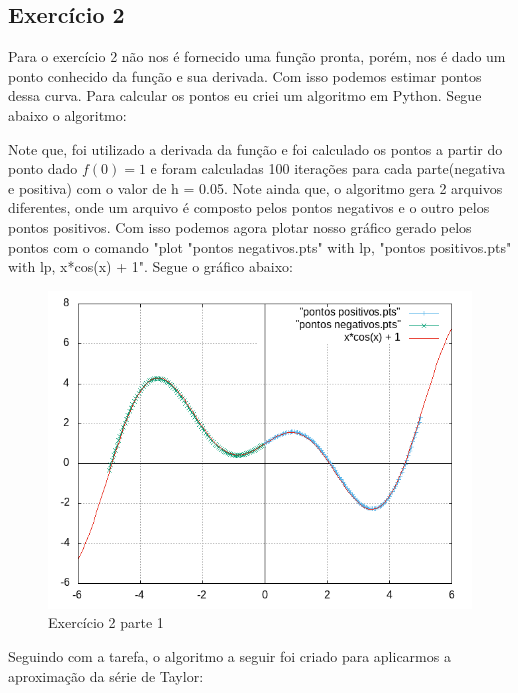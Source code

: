 \documentclass{article}
\begin{document}
    \subsection*{Exercício 2}
    \hspace{1cm}Para o exercício 2 não nos é fornecido uma função pronta, porém, nos é dado um ponto conhecido da função e sua derivada. Com isso podemos estimar pontos dessa curva. Para calcular os pontos eu criei um algoritmo em Python. Segue abaixo o algoritmo:
    
    \hspace{1cm}Note que, foi utilizado a derivada da função e foi calculado os pontos a partir do ponto dado $f(0) = 1$ e foram calculadas 100 iterações para cada parte(negativa e positiva) com o valor de h = 0.05. Note ainda que, o algoritmo gera 2 arquivos diferentes, onde um arquivo é composto pelos pontos negativos e o outro pelos pontos positivos.\newline
    \hspace*{1cm}Com isso podemos agora plotar nosso gráfico gerado pelos pontos com o comando "plot "pontos negativos.pts" with lp, "pontos positivos.pts" with lp, x*cos(x) + 1".
    Segue o gráfico abaixo:\newline
    \begin{figure}[!h]
       \centering %
        \includegraphics[scale=0.6]{exercicio2.png}
        \caption{Exercício 2 parte 1}
        \label{img:Exercício 2 parte 1}
    \end{figure}
    \newline \hspace*{1cm}Seguindo com a tarefa, o algoritmo a seguir foi criado para aplicarmos a aproximação da série de Taylor: 
\end{document}

